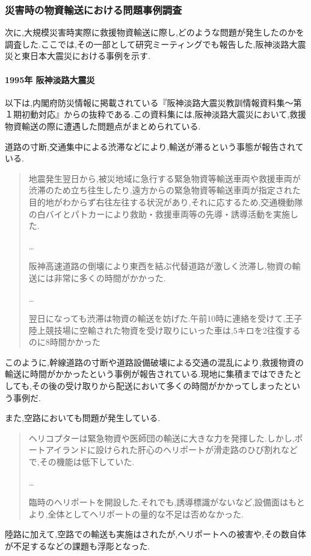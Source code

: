 \documentclass{article}[jsarticle]
\begin{document}
\subsubsection{災害時の物資輸送における問題事例調査}
次に,大規模災害時実際に救援物資輸送に際し,どのような問題が発生したのかを調査した.ここでは,その一部として研究ミーティングでも報告した,阪神淡路大震災と東日本大震災における事例を示す.
\paragraph{1995年 阪神淡路大震災} 
以下は,内閣府防災情報に掲載されている『阪神淡路大震災教訓情報資料集～第１期初動対応』からの抜粋である.この資料集には,阪神淡路大震災において,救援物資輸送の際に遭遇した問題点がまとめられている.\par
道路の寸断,交通集中による渋滞などにより,輸送が滞るという事態が報告されている.
\begin{quote}
    地震発生翌日から,被災地域に急行する緊急物資等輸送車両や救援車両が渋滞のため立ち往生したり,遠方からの緊急物資等輸送車両が指定された目的地がわからず右往左往する状況があり,それに応するため,交通機動隊の白バイとパトカーにより救助・救援車両等の先導・誘導活動を実施した.\par 
    \ldots \par
    阪神高速道路の倒壊により東西を結ぶ代替道路が激しく渋滞し,物資の輸送には非常に多くの時間がかかった.\par 
    \ldots \par
    翌日になっても渋滞は物資の輸送を妨げた.午前10時に連絡を受けて,王子陸上競技場に空輸された物資を受け取りにいった車は,5キロを2往復するのに8時間かかった
\end{quote}
このように,幹線道路の寸断や道路設備破壊による交通の混乱により,救援物資の輸送に時間がかかったという事例が報告されている.現地に集積まではできたとしても,その後の受け取りから配送において多くの時間がかかってしまったという事例だ. \par 
また,空路においても問題が発生している.
\begin{quote}
    ヘリコプターは緊急物資や医師団の輸送に大きな力を発揮した.しかし,ポートアイランドに設けられた肝心のヘリポートが滑走路のひび割れなどで,その機能は低下していた.\par
    \ldots \par
    臨時のヘリポートを開設した.それでも,誘導標識がないなど,設備面はもとより,全体としてヘリポートの量的な不足は否めなかった.
\end{quote}
陸路に加えて,空路での輸送も実施はされたが,ヘリポートへの被害や,その数自体が不足するなどの課題も浮彫となった.
\end{document}

